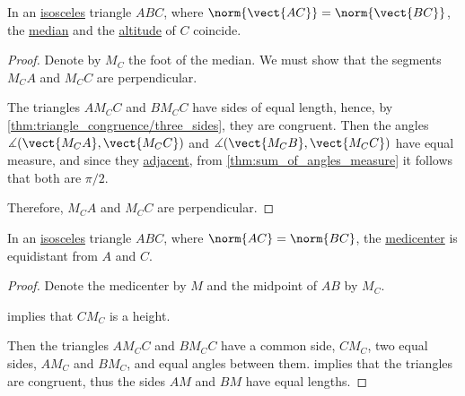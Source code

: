 \begin{proposition}\label{thm:triangle_similarity}

  \begin{thmenum}
  \end{thmenum}
\end{proposition}

\begin{proposition}\label{thm:isosceles_median_and_altitude}
  In an \hyperref[def:triangle/isosceles]{isosceles} triangle \( ABC \), where \( \norm{\vect{AC}} = \norm{\vect{BC}} \), the \hyperref[def:triangle_median]{median} and the \hyperref[def:triangle_altitude]{altitude} of \( C \) coincide.
\end{proposition}
\begin{proof}
  Denote by \( M_C \) the foot of the median. We must show that the segments \( M_C A \) and \( M_C C \) are perpendicular.

  The triangles \( A M_C C \) and \( B M_C C \) have sides of equal length, hence, by \cref{thm:triangle_congruence/three_sides}, they are congruent. Then the angles \( \measuredangle(\vect{M_C A}, \vect{M_C C}) \) and \( \measuredangle(\vect{M_C B}, \vect{M_C C}) \) have equal measure, and since they \hyperref[def:adjacent_angles]{adjacent}, from \cref{thm:sum_of_angles_measure} it follows that both are \( \pi / 2 \).

  Therefore, \( M_C A \) and \( M_C C \) are perpendicular.
\end{proof}

\begin{proposition}\label{thm:isosceles_medicenter}
  In an \hyperref[def:triangle/isosceles]{isosceles} triangle \( ABC \), where \( \norm{AC} = \norm{BC} \), the \hyperref[thm:medicenter]{medicenter} is equidistant from \( A \) and \( C \).
\end{proposition}
\begin{proof}
  Denote the medicenter by \( M \) and the midpoint of \( AB \) by \( M_C \).

   implies that \( CM_C \) is a height.

  Then the triangles \( A M_C C \) and \( B M_C C \) have a common side, \( C M_C \), two equal sides, \( A M_C \) and \( B M_C \), and equal angles between them.  implies that the triangles are congruent, thus the sides \( A M \) and \( B M \) have equal lengths.
\end{proof}


